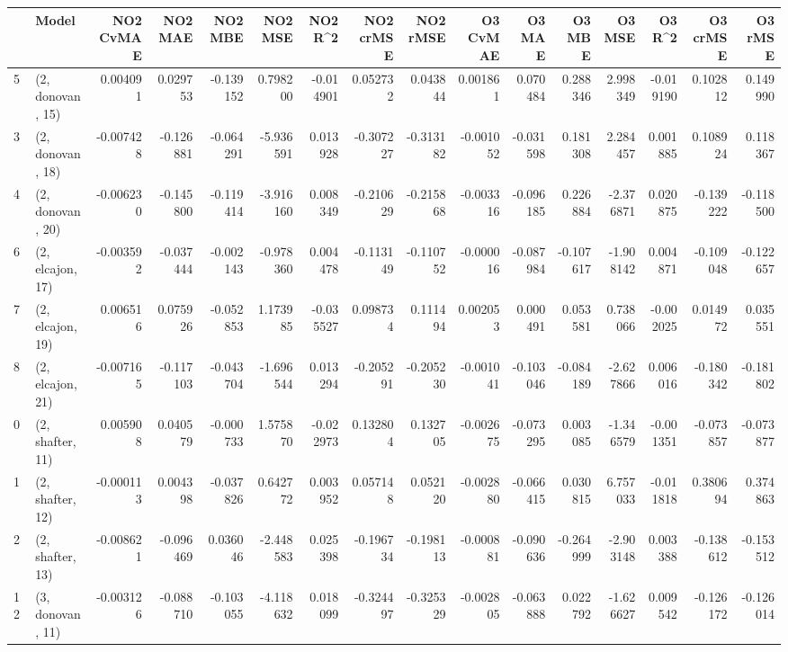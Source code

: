 \begin{tabular}{llrrrrrrrrrrrrrr}
\toprule
{} &             Model &  NO2 CvMAE &   NO2 MAE &   NO2 MBE &    NO2 MSE &   NO2 R\textasciicircum2 &  NO2 crMSE &  NO2 rMSE &  O3 CvMAE &    O3 MAE &    O3 MBE &     O3 MSE &    O3 R\textasciicircum2 &  O3 crMSE &   O3 rMSE \\
\midrule
5  &  (2, donovan, 15) &   0.004091 &  0.029753 & -0.139152 &   0.798200 & -0.014901 &   0.052732 &  0.043844 &  0.001861 &  0.070484 &  0.288346 &   2.998349 & -0.019190 &  0.102812 &  0.149990 \\
3  &  (2, donovan, 18) &  -0.007428 & -0.126881 & -0.064291 &  -5.936591 &  0.013928 &  -0.307227 & -0.313182 & -0.001052 & -0.031598 &  0.181308 &   2.284457 &  0.001885 &  0.108924 &  0.118367 \\
4  &  (2, donovan, 20) &  -0.006230 & -0.145800 & -0.119414 &  -3.916160 &  0.008349 &  -0.210629 & -0.215868 & -0.003316 & -0.096185 &  0.226884 &  -2.376871 &  0.020875 & -0.139222 & -0.118500 \\
6  &  (2, elcajon, 17) &  -0.003592 & -0.037444 & -0.002143 &  -0.978360 &  0.004478 &  -0.113149 & -0.110752 & -0.000016 & -0.087984 & -0.107617 &  -1.908142 &  0.004871 & -0.109048 & -0.122657 \\
7  &  (2, elcajon, 19) &   0.006516 &  0.075926 & -0.052853 &   1.173985 & -0.035527 &   0.098734 &  0.111494 &  0.002053 &  0.000491 &  0.053581 &   0.738066 & -0.002025 &  0.014972 &  0.035551 \\
8  &  (2, elcajon, 21) &  -0.007165 & -0.117103 & -0.043704 &  -1.696544 &  0.013294 &  -0.205291 & -0.205230 & -0.001041 & -0.103046 & -0.084189 &  -2.627866 &  0.006016 & -0.180342 & -0.181802 \\
0  &  (2, shafter, 11) &   0.005908 &  0.040579 & -0.000733 &   1.575870 & -0.022973 &   0.132804 &  0.132705 & -0.002675 & -0.073295 &  0.003085 &  -1.346579 & -0.001351 & -0.073857 & -0.073877 \\
1  &  (2, shafter, 12) &  -0.000113 &  0.004398 & -0.037826 &   0.642772 &  0.003952 &   0.057148 &  0.052120 & -0.002880 & -0.066415 &  0.030815 &   6.757033 & -0.011818 &  0.380694 &  0.374863 \\
2  &  (2, shafter, 13) &  -0.008621 & -0.096469 &  0.036046 &  -2.448583 &  0.025398 &  -0.196734 & -0.198113 & -0.000881 & -0.090636 & -0.264999 &  -2.903148 &  0.003388 & -0.138612 & -0.153512 \\
12 &  (3, donovan, 11) &  -0.003126 & -0.088710 & -0.103055 &  -4.118632 &  0.018099 &  -0.324497 & -0.325329 & -0.002805 & -0.063888 &  0.022792 &  -1.626627 &  0.009542 & -0.126172 & -0.126014 \\

\end{tabular}
